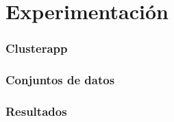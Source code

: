\section{Experimentación}\label{sec:results}

\begin{frame}
    \frametitle{Clusterapp}

\end{frame}

\begin{frame}
    \frametitle{Conjuntos de datos}

\end{frame}

\begin{frame}
    \frametitle{Resultados}

\end{frame}